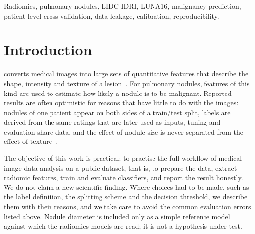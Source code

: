 \documentclass[journal]{IEEEtran}
\begin{document}
\begin{IEEEkeywords}
Radiomics, pulmonary nodules, LIDC-IDRI, LUNA16, malignancy prediction, patient-level cross-validation,
data leakage, calibration, reproducibility.
\end{IEEEkeywords}

\section{Introduction}
 converts medical images into large sets of quantitative features that
describe the shape, intensity and texture of a lesion~\cite{lambin2012radiomics,gillies2016radiomics}.
For pulmonary nodules, features of this kind are used to estimate how likely a nodule is to be
malignant. Reported results are often optimistic for reasons that have little to do with the images:
nodules of one patient appear on both sides of a train/test split, labels are derived from the same
ratings that are later used as inputs, tuning and evaluation share data, and the effect of nodule
size is never separated from the effect of texture~\cite{kapoor2023leakage,cawley2010overfitting,varma2006bias}.

The objective of this work is practical: to practise the full workflow of medical image data analysis on a
public dataset, that is, to prepare the data, extract radiomic features, train and evaluate classifiers, and
report the result honestly. We do not claim a new scientific finding. Where choices had to be made, such as
the label definition, the splitting scheme and the decision threshold, we describe them with their reasons, and we
take care to avoid the common evaluation errors listed above. Nodule diameter is included only as a simple reference
model against which the radiomics models are read; it is not a hypothesis under test.
\end{document}
